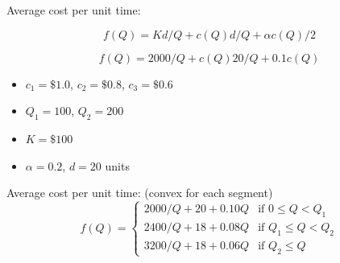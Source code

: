\begin{question}
\begin{solution}
Average cost per unit time:

\begin{equation*}
f(Q) = Kd / Q + c(Q)d / Q + \alpha c(Q) / 2
\end{equation*}

\begin{equation*}
f(Q) = 2000 / Q + c(Q)20 / Q + 0.1 c(Q)
\end{equation*}

\begin{itemize}
\item $c_1 = \mathdollar 1.0$, $c_2 = \mathdollar 0.8$, $c_3 = \mathdollar 0.6$
\item $Q_1 = 100$, $Q_2 = 200$
\end{itemize}

\begin{itemize}
\item $K = \mathdollar 100$
\item $\alpha = 0.2$, $d = 20$ units
\end{itemize}

Average cost per unit time: (convex for each segment)
\begin{equation*}
f(Q) = 
\begin{cases}
2000 / Q + 20 + 0.10Q & \text{if } 0 \leq Q < Q_1 \\
2400 / Q + 18 + 0.08Q & \text{if } Q_1 \leq Q < Q_2 \\
3200 / Q + 18 + 0.06Q & \text{if } Q_2 \leq Q 
\end{cases}
\end{equation*}

\begin{center}
\end{center}
\end{solution}
\end{question}
